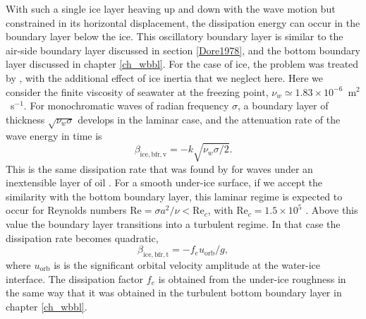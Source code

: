 With such a single ice layer heaving up and down with the wave motion but constrained in its horizontal displacement, the dissipation energy can occur in the boundary layer below the ice. This oscillatory boundary layer is similar to the air-side boundary layer discussed in section \ref{Dore1978}, and the bottom boundary layer discussed in chapter \ref{ch_wbbl}. For the case of ice, the problem was treated by \cite{Liu&MolloChristensen1988}, with the additional effect of ice inertia that we neglect here. Here we consider the finite viscosity of seawater at the freezing point, $\nu_w \simeq 1.83 \times 10^{-6}$~m$^2$~s$^{-1}$. For monochromatic waves of radian frequency $\sigma$,  a boundary layer of thickness $\sqrt{\nu_w \sigma}$ develops in the laminar case, and the attenuation rate of the wave energy in time is 
\begin{equation}
\beta_{\mathrm{ice,bfr,v}}=-k\sqrt{\nu_w \sigma / 2}.  \label{eq:beta_ice_visc}                                                                                                                                                                                                                                                                                                                                                                                                                                                                                                                                                                                                                                                                                                                                                                         
\end{equation}
This is the same dissipation rate that was found by \cite{Phillips1977} for waves under an inextensible layer of oil \citep[see also][]{Weber1987}.
For a smooth under-ice surface, if we accept the similarity with the bottom boundary layer, this laminar regime is expected to occur for Reynolds numbers $\mathrm{Re} = \sigma a^2/\nu < \mathrm{Re} _c$, with $\mathrm{Re} _c=1.5 \times 10^5$ \citep{Jensen&al.1989}. Above this value the boundary layer transitions into a turbulent regime. In that case the dissipation rate becomes quadratic,
\begin{equation}
\beta_{\mathrm{ice,bfr,t}}=-f_e u_{\mathrm{orb}} / g,\label{eq:beta_ice_turb}
\end{equation}
where $u_{\mathrm{orb}}$ is is the significant orbital velocity amplitude at the water-ice interface. 
The dissipation factor $f_e$ is obtained from the under-ice roughness in the same way that it was obtained in the turbulent bottom boundary layer in chapter \ref{ch_wbbl}.


